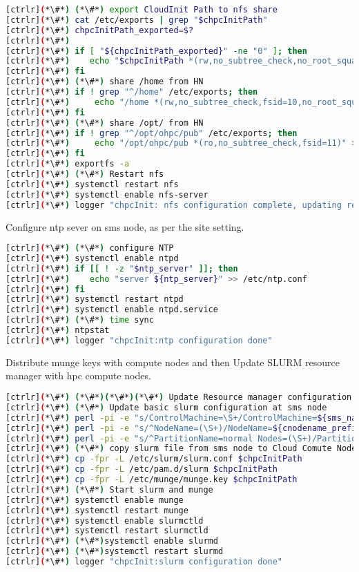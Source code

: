 \begin{lstlisting}[language=bash,keywords={}]
[ctrlr](*\#*) (*\#*) export CloudInit Path to nfs share
[ctrlr](*\#*) cat /etc/exports | grep "$chpcInitPath"
[ctrlr](*\#*) chpcInitPath_exported=$?
[ctrlr](*\#*) 
[ctrlr](*\#*) if [ "${chpcInitPath_exported}" -ne "0" ]; then
[ctrlr](*\#*)    echo "$chpcInitPath *(rw,no_subtree_check,no_root_squash)" >> /etc/exports
[ctrlr](*\#*) fi
[ctrlr](*\#*) (*\#*) share /home from HN
[ctrlr](*\#*) if ! grep "^/home" /etc/exports; then
[ctrlr](*\#*)     echo "/home *(rw,no_subtree_check,fsid=10,no_root_squash)" >> /etc/exports
[ctrlr](*\#*) fi
[ctrlr](*\#*) (*\#*) share /opt/ from HN
[ctrlr](*\#*) if ! grep "^/opt/ohpc/pub" /etc/exports; then
[ctrlr](*\#*)     echo "/opt/ohpc/pub *(ro,no_subtree_check,fsid=11)" >> /etc/exports
[ctrlr](*\#*) fi
[ctrlr](*\#*) exportfs -a
[ctrlr](*\#*) (*\#*) Restart nfs
[ctrlr](*\#*) systemctl restart nfs
[ctrlr](*\#*) systemctl enable nfs-server
[ctrlr](*\#*) logger "chpcInit: nfs configuration complete, updating remaining HPC configuration" 
\end{lstlisting}

Configure ntp sever on sms node, as per the site setting.


\begin{lstlisting}[language=bash,keywords={}]
[ctrlr](*\#*) (*\#*) configure NTP
[ctrlr](*\#*) systemctl enable ntpd
[ctrlr](*\#*) if [[ ! -z "$ntp_server" ]]; then
[ctrlr](*\#*)    echo "server ${ntp_server}" >> /etc/ntp.conf
[ctrlr](*\#*) fi
[ctrlr](*\#*) systemctl restart ntpd
[ctrlr](*\#*) systemctl enable ntpd.service
[ctrlr](*\#*) (*\#*) time sync
[ctrlr](*\#*) ntpstat
[ctrlr](*\#*) logger "chpcInit:ntp configuration done"
\end{lstlisting}

Distribute munge keys with compute nodes and then Update SLURM resource manager with hpc compute nodes.


\begin{lstlisting}[language=bash,keywords={}]
[ctrlr](*\#*) (*\#*)(*\#*)(*\#*) Update Resource manager configuration (*\#*)(*\#*)(*\#*)
[ctrlr](*\#*) (*\#*) Update basic slurm configuration at sms node
[ctrlr](*\#*) perl -pi -e "s/ControlMachine=\S+/ControlMachine=${sms_name}/" /etc/slurm/slurm.conf
[ctrlr](*\#*) perl -pi -e "s/^NodeName=(\S+)/NodeName=${cnodename_prefix}[1-${num_ccomputes}]/" /etc/slurm/slurm.conf
[ctrlr](*\#*) perl -pi -e "s/^PartitionName=normal Nodes=(\S+)/PartitionName=normal Nodes=${cnodename_prefix}[1-${num_ccomputes}]/" /etc/slurm/slurm.conf
[ctrlr](*\#*) (*\#*) copy slurm file from sms node to Cloud Comute Nodes
[ctrlr](*\#*) cp -fpr -L /etc/slurm/slurm.conf $chpcInitPath
[ctrlr](*\#*) cp -fpr -L /etc/pam.d/slurm $chpcInitPath
[ctrlr](*\#*) cp -fpr -L /etc/munge/munge.key $chpcInitPath
[ctrlr](*\#*) (*\#*) Start slurm and munge 
[ctrlr](*\#*) systemctl enable munge
[ctrlr](*\#*) systemctl restart munge
[ctrlr](*\#*) systemctl enable slurmctld
[ctrlr](*\#*) systemctl restart slurmctld
[ctrlr](*\#*) (*\#*)systemctl enable slurmd
[ctrlr](*\#*) (*\#*)systemctl restart slurmd
[ctrlr](*\#*) logger "chpcInit:slurm configuration done"
\end{lstlisting}


